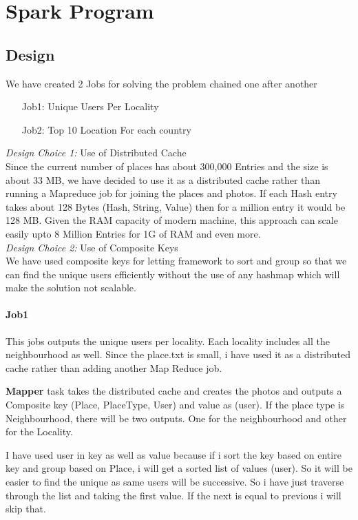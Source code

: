 \chapter{Spark Program}

\section{Design}
	We have created 2 Jobs for solving the problem chained one after another\\
	\begin{itemize}
		\item [Job1:] Unique Users Per Locality  
		\item [Job2:] Top 10 Location For each country
	\end{itemize}

	
	\emph{Design Choice 1:}  Use of Distributed Cache \\
		Since the current number of places has about 300,000 Entries and the size is about 33 MB, we have decided to use it as a distributed cache rather than running a Mapreduce job for joining the places and photos. If each Hash entry takes about 128 Bytes (Hash, String, Value) then for a million entry it would be 128 MB. Given the RAM capacity of modern machine, this approach can scale easily upto 8 Million Entries for 1G of RAM and even more. \\
	\emph{Design Choice 2:} Use of Composite Keys \\
		We have used composite keys for letting framework to sort and group so that we can find the unique users efficiently without the use of any hashmap which will make the solution not scalable. 
		
\subsubsection{Job1}
	This jobs outputs the unique users per locality. Each locality includes all the neighbourhood as well. Since the place.txt is small, i have used it as a distributed cache rather than adding another Map Reduce job.
	
	\textbf{Mapper} task takes the distributed cache and creates the photos and outputs a Composite key (Place, PlaceType, User) and value as (user). If the place type is Neighbourhood, there will be two outputs. One for the neighbourhood and other for the Locality. 
	
	 I have used user in key as well as value because if i sort the key based on entire key and group based on Place, i will get a sorted list of values (user). So it will be easier to find the unique as same users will be successive. So i have just traverse through the list and taking the first value. If the next is equal to previous i will skip that. 
	
